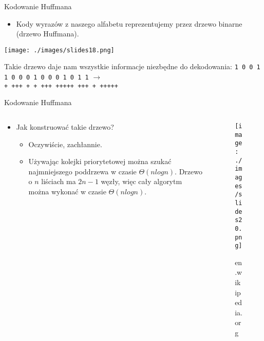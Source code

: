 \documentclass[presentation]{beamer}
\begin{document}
\begin{frame}[label={sec:org17972ef}]{Kodowanie Huffmana}
\begin{itemize}
\item Kody wyrazów z naszego alfabetu reprezentujemy przez drzewo
binarne (drzewo Huffmana).
\end{itemize}

\begin{center}
\texttt{[image: ./images/slides18.png]}
\end{center}

\begin{block}{Takie drzewo daje nam wszystkie informacje niezbędne do dekodowania:}
\texttt{1 0 0 1 1 0 0 0 1 0 0 0 1 0 1 1} \(\rightarrow\)  \\
\texttt{+ +++ + + +++ +++++ +++ + +++++}
\end{block}
\end{frame}

\begin{frame}[label={sec:orgf5c935e}]{Kodowanie Huffmana}
\begin{columns}
\begin{column}{0.45\columnwidth}
\begin{itemize}
\item Jak konstruować takie drzewo?
\begin{itemize}
\item Oczywiście, zachłannie.
\item Używając kolejki priorytetowej można szukać najmniejszego
poddrzewa w czasie \(\Theta(n log n)\). Drzewo o \(n\) liściach ma
\(2n - 1\) węzły, więc cały algorytm można wykonać w czasie
\(\Theta(n log n)\).
\end{itemize}
\end{itemize}
\end{column}

\begin{column}{0.45\columnwidth}
\begin{figure}[htbp]
\centering
\texttt{[image: ./images/slides20.png]}
\caption{en.wikipedia.org}
\end{figure}
\end{column}
\end{columns}
\end{frame}
\end{document}
